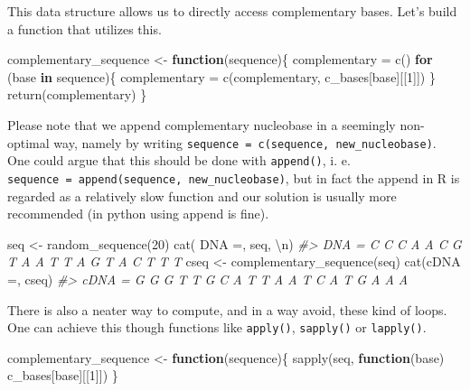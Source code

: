 \documentclass[
]{book}
\newenvironment{Shaded}{\begin{snugshade}}{\end{snugshade}}
\newcommand{\CommentTok}[1]{\textcolor[rgb]{0.56,0.35,0.01}{\textit{#1}}}
\newcommand{\ControlFlowTok}[1]{\textcolor[rgb]{0.13,0.29,0.53}{\textbf{#1}}}
\newcommand{\DecValTok}[1]{\textcolor[rgb]{0.00,0.00,0.81}{#1}}
\newcommand{\FunctionTok}[1]{\textcolor[rgb]{0.00,0.00,0.00}{#1}}
\newcommand{\NormalTok}[1]{#1}
\newcommand{\OtherTok}[1]{\textcolor[rgb]{0.56,0.35,0.01}{#1}}
\newcommand{\SpecialCharTok}[1]{\textcolor[rgb]{0.00,0.00,0.00}{#1}}
\newcommand{\StringTok}[1]{\textcolor[rgb]{0.31,0.60,0.02}{#1}}
\begin{document}
This data structure allows us to directly access complementary bases. Let's build a function that utilizes this.

\begin{Shaded}
\begin{Highlighting}[]
\NormalTok{complementary\_sequence }\OtherTok{\textless{}{-}} \ControlFlowTok{function}\NormalTok{(sequence)\{}
\NormalTok{  complementary }\OtherTok{=} \FunctionTok{c}\NormalTok{()}
  \ControlFlowTok{for}\NormalTok{ (base }\ControlFlowTok{in}\NormalTok{ sequence)\{}
\NormalTok{    complementary }\OtherTok{=} \FunctionTok{c}\NormalTok{(complementary, c\_bases[base][[}\DecValTok{1}\NormalTok{]])}
\NormalTok{  \}}
  \FunctionTok{return}\NormalTok{(complementary)}
\NormalTok{\}}
\end{Highlighting}
\end{Shaded}

Please note that we append complementary nucleobase in a seemingly non-optimal way, namely by writing \texttt{sequence\ =\ c(sequence,\ new\_nucleobase)}. One could argue that this should be done with \texttt{append()}, i. e. \texttt{sequence\ =\ append(sequence,\ new\_nucleobase)}, but in fact the append in R is regarded as a relatively slow function and our solution is usually more recommended (in python using append is fine).

\begin{Shaded}
\begin{Highlighting}[]
\NormalTok{seq }\OtherTok{\textless{}{-}} \FunctionTok{random\_sequence}\NormalTok{(}\DecValTok{20}\NormalTok{)}
\FunctionTok{cat}\NormalTok{(}\StringTok{\textquotesingle{} DNA =\textquotesingle{}}\NormalTok{, seq, }\StringTok{\textquotesingle{}}\SpecialCharTok{\textbackslash{}n}\StringTok{\textquotesingle{}}\NormalTok{)}
\CommentTok{\#\textgreater{}  DNA = C C C A A C G T A A T T A G T A C T T T}
\NormalTok{cseq }\OtherTok{\textless{}{-}} \FunctionTok{complementary\_sequence}\NormalTok{(seq)}
\FunctionTok{cat}\NormalTok{(}\StringTok{\textquotesingle{}cDNA =\textquotesingle{}}\NormalTok{, cseq)}
\CommentTok{\#\textgreater{} cDNA = G G G T T G C A T T A A T C A T G A A A}
\end{Highlighting}
\end{Shaded}

There is also a neater way to compute, and in a way avoid, these kind of loops. One can achieve this though functions like \texttt{apply()}, \texttt{sapply()} or \texttt{lapply()}.

\begin{Shaded}
\begin{Highlighting}[]
\NormalTok{complementary\_sequence }\OtherTok{\textless{}{-}} \ControlFlowTok{function}\NormalTok{(sequence)\{}
  \FunctionTok{sapply}\NormalTok{(seq, }\ControlFlowTok{function}\NormalTok{(base) c\_bases[base][[}\DecValTok{1}\NormalTok{]])}
\NormalTok{\}}
\end{Highlighting}
\end{Shaded}
\end{document}
